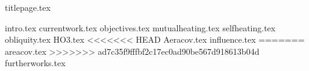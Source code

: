 \documentclass[twoside, twocolumn]{article}
\begin{document}
{titlepage.tex}

{intro.tex}
{currentwork.tex}
{objectives.tex}
{mutualheating.tex}
{selfheating.tex}
{obliquity.tex}
{HO3.tex}
<<<<<<< HEAD
{Aeracov.tex}
{influence.tex}
=======
{areacov.tex}
>>>>>>> ad7c35f9fffbf2c17ec0ad90be567d918613b04d
{furtherworks.tex}

\nocite{*}
\end{document}

